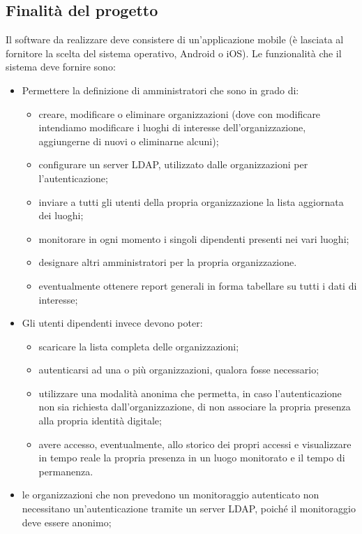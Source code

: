 \documentclass[../studio-di-fattibilita.tex]{subfiles}
\begin{document}
  \subsection{Finalità del progetto}%
  \label{subsec:finalita_del_progetto}
  Il software da realizzare deve consistere di un'applicazione mobile (è lasciata al fornitore la scelta del sistema operativo, Android o iOS). Le funzionalità che il sistema deve fornire sono:
  \begin{itemize}
    \item Permettere la definizione di amministratori che sono in grado di:
    \begin{itemize}
        \item creare, modificare o eliminare organizzazioni (dove con modificare intendiamo modificare i luoghi di interesse dell’organizzazione, aggiungerne di nuovi o eliminarne alcuni);
        \item configurare un server LDAP, utilizzato dalle organizzazioni per l'autenticazione;
        \item inviare a tutti gli utenti della propria organizzazione la lista aggiornata dei luoghi;
        \item monitorare in ogni momento i singoli dipendenti presenti nei vari luoghi;
        \item designare altri amministratori per la propria organizzazione.
        \item eventualmente ottenere report generali in forma tabellare su tutti i dati di interesse;
    \end{itemize}
    \item Gli utenti dipendenti invece devono poter:
    \begin{itemize}
        \item scaricare la lista completa delle organizzazioni;
        \item autenticarsi ad una o più organizzazioni, qualora fosse necessario;
        \item utilizzare una modalità anonima che permetta, in caso l’autenticazione non sia richiesta dall’organizzazione, di non associare la propria presenza alla propria identità digitale;
        \item avere accesso, eventualmente, allo storico dei propri accessi e visualizzare in tempo reale la propria presenza in un luogo monitorato e il tempo di permanenza.
    \end{itemize}
    \item le organizzazioni che non prevedono un monitoraggio autenticato non necessitano un'autenticazione tramite un server LDAP, poiché il monitoraggio deve essere anonimo;

\end{itemize}
\end{document}
